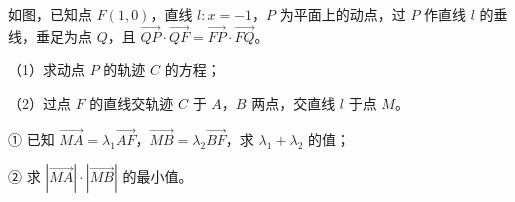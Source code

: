 \begin{question}
如图，已知点 $F(1,0)$，直线 $l:x=-1$，$P$ 为平面上的动点，过 $P$ 作直线 $l$ 的垂线，垂足为点 $Q$，且 $\overrightarrow{QP}\cdot\overrightarrow{QF}=\overrightarrow{FP}\cdot\overrightarrow{FQ}$。

（1）求动点 $P$ 的轨迹 $C$ 的方程；

（2）过点 $F$ 的直线交轨迹 $C$ 于 $A$，$B$ 两点，交直线 $l$ 于点 $M$。

① 已知 $\overrightarrow{MA}=\lambda_1\overrightarrow{AF}$，$\overrightarrow{MB}=\lambda_2\overrightarrow{BF}$，求 $\lambda_1+\lambda_2$ 的值；

② 求 $\left|\overrightarrow{MA}\right|\cdot\left|\overrightarrow{MB}\right|$ 的最小值。
\nopagebreak[4]
\begin{center}\end{center}
\nopagebreak[4]

\end{question}